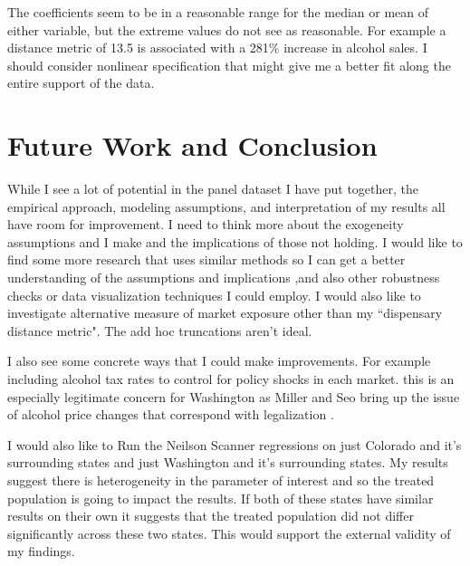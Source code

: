 \documentclass[11pt]{article}
\begin{document}
The coefficients seem to be in a reasonable range for the median or mean of either variable, but the extreme values do not see as reasonable. For example a distance metric of 13.5 is associated with a 281\% increase in alcohol sales. I should consider nonlinear specification that might give me a better fit along the entire support of the data. 





\section{Future Work and Conclusion }
While I see a lot of potential in the panel dataset I have put together, the empirical approach, modeling assumptions, and interpretation of my results all have room for improvement. I need to think more about the exogeneity assumptions and I make and the implications of those not holding. I would like to find some more research that uses similar methods so I can get a better understanding of the assumptions and implications ,and also other robustness checks or data visualization techniques I could employ. I would also like to investigate alternative measure of market exposure other than my ``dispensary distance metric". The add hoc truncations aren't ideal.  \par

I also see some concrete ways that I could make improvements. For example including alcohol tax rates to control for policy shocks in each market. this is an especially legitimate concern for Washington as Miller and Seo bring up the issue of alcohol price changes that correspond with legalization \cite{miller_seo_2018}. \par

I would also like to Run the Neilson Scanner regressions on just Colorado and it's surrounding states and just Washington and it's surrounding states. My results suggest there is heterogeneity in the parameter of interest and so the treated population is going to impact the results. If both of these states have similar results on their own it suggests that the treated population did not differ significantly across these two states. This would support the external validity of my findings. \par
\end{document}
